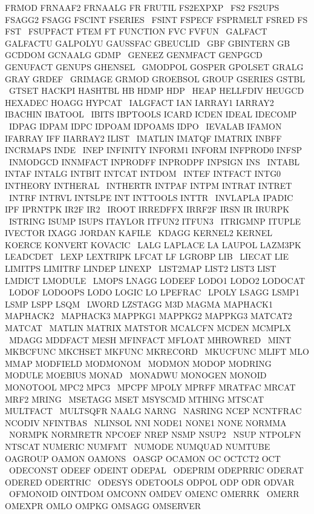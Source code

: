 \documentclass{article}
\begin{document}
     FRMOD FRNAAF2 FRNAALG FR FRUTIL FS2EXPXP \
     FS2 FS2UPS FSAGG2 FSAGG FSCINT FSERIES \
     FSINT FSPECF FSPRMELT FSRED FS FST \
     FSUPFACT FTEM FT FUNCTION FVC FVFUN \
     GALFACT GALFACTU GALPOLYU GAUSSFAC GBEUCLID \
     GBF GBINTERN GB GCDDOM GCNAALG GDMP \
     GENEEZ GENMFACT GENPGCD GENUFACT GENUPS GHENSEL \
     GMODPOL GOSPER GPOLSET GRALG GRAY GRDEF \
     GRIMAGE GRMOD GROEBSOL GROUP GSERIES GSTBL \
     GTSET HACKPI HASHTBL HB HDMP HDP \
     HEAP HELLFDIV HEUGCD HEXADEC HOAGG HYPCAT \
     IALGFACT IAN IARRAY1 IARRAY2 IBACHIN IBATOOL \
     IBITS IBPTOOLS ICARD ICDEN IDEAL IDECOMP \
     IDPAG IDPAM IDPC IDPOAM IDPOAMS IDPO \
     IEVALAB IFAMON IFARRAY IFF IIARRAY2 ILIST \
     IMATLIN IMATQF IMATRIX INBFF INCRMAPS INDE \
     INEP INFINITY INFORM1 INFORM INFPROD0 INFSP \
     INMODGCD INNMFACT INPRODFF INPRODPF INPSIGN INS \
     INTABL INTAF INTALG INTBIT INTCAT INTDOM \
     INTEF INTFACT INTG0 INTHEORY INTHERAL \
     INTHERTR INTPAF INTPM INTRAT INTRET \
     INTRF INTRVL INTSLPE INT INTTOOLS INTTR \
     INVLAPLA IPADIC IPF IPRNTPK IR2F IR2 \
     IROOT IRREDFFX IRRF2F IRSN IR IRURPK \
     ISTRING ISUMP ISUPS ITAYLOR ITFUN2 ITFUN3 \
     ITRIGMNP ITUPLE IVECTOR IXAGG JORDAN KAFILE \
     KDAGG KERNEL2 KERNEL KOERCE KONVERT KOVACIC \
     LALG LAPLACE LA LAUPOL LAZM3PK LEADCDET \
     LEXP LEXTRIPK LFCAT LF LGROBP LIB \
     LIECAT LIE LIMITPS LIMITRF LINDEP LINEXP \
     LIST2MAP LIST2 LIST3 LIST LMDICT LMODULE \
     LMOPS LNAGG LODEEF LODO1 LODO2 LODOCAT \
     LODOF LODOOPS LODO LOGIC LO LPEFRAC \
     LPOLY LSAGG LSMP1 LSMP LSPP LSQM \
     LWORD LZSTAGG M3D MAGMA MAPHACK1 MAPHACK2 \
     MAPHACK3 MAPPKG1 MAPPKG2 MAPPKG3 MATCAT2 MATCAT \
     MATLIN MATRIX MATSTOR MCALCFN MCDEN MCMPLX \
     MDAGG MDDFACT MESH MFINFACT MFLOAT MHROWRED \
     MINT MKBCFUNC MKCHSET MKFUNC MKRECORD \
     MKUCFUNC MLIFT MLO MMAP MODFIELD MODMONOM \
     MODMON MODOP MODRING MODULE MOEBIUS MONAD \
     MONADWU MONOGEN MONOID MONOTOOL MPC2 MPC3 \
     MPCPF MPOLY MPRFF MRATFAC MRCAT MRF2 MRING \
     MSETAGG MSET MSYSCMD MTHING MTSCAT MULTFACT \
     MULTSQFR NAALG NARNG \
     NASRING NCEP NCNTFRAC NCODIV NFINTBAS \
     NLINSOL NNI NODE1 NONE1 NONE NORMMA \
     NORMPK NORMRETR NPCOEF NREP NSMP NSUP2 \
     NSUP NTPOLFN NTSCAT NUMERIC NUMFMT \
     NUMODE NUMQUAD NUMTUBE OAGROUP OAMON OAMONS \
     OASGP OCAMON OC OCTCT2 OCT \
     ODECONST ODEEF ODEINT ODEPAL \
     ODEPRIM ODEPRRIC ODERAT ODERED ODERTRIC \
     ODESYS ODETOOLS ODPOL ODP ODR ODVAR \
     OFMONOID OINTDOM OMCONN OMDEV OMENC OMERRK \
     OMERR OMEXPR OMLO OMPKG OMSAGG OMSERVER \
\end{document}
